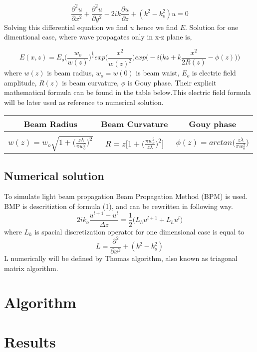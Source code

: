 \documentclass{article}
\begin{document}
	\begin{equation}
	\frac{\partial^2 u}{\partial x^2}+ \frac{\partial^2 u}{\partial y^2} - 2ik\frac{\partial u}{\partial z}+(k^2-k_o^2)u=0
	\end{equation}
	Solving this differential equation we find $u$ hence we find $E$. Solution for one dimentional case, where wave propagates only in x-z plane is,
	
	\[E(x,z)=E_o\bigg(\frac{w_o}{w(z)}\bigg)^{\frac{1}{2}}exp\bigg(\frac{x^2}{w(z)^2}\bigg)exp\bigg(-i\Big(kz+k\frac{x^2}{2R(z)}-\phi(z)\Big)\bigg)\]
	where
	$w(z)$ is beam radius, $w_o = w(0)$ is beam waist, $E_o$ is electric field amplitude, $R(z)$ is beam curvature, $\phi$ is Gouy phase. Their explicit mathematical formula can be found in the table below.This electric field formula will be later used as reference to numerical solution.
	

	\begin{table}[h!]
		\begin{center}
			\label{tab:table1}
			\begin{tabular}{c| c| c} %
				\textbf{Beam Radius} & \textbf{Beam Curvature} & \textbf{Gouy phase}\\
				\hline
				&&\\
				$w(z)= w_o\sqrt{1+\Big(\frac{z\lambda}{\pi w_o^2}\Big)^2}$ & $R=z\bigg[1+\Big(\frac{\pi w_o^2}{z\lambda}\Big)^2\bigg]$ & $\phi(z)=arctan\Big(\frac{z\lambda}{\pi w_o^2}\Big)$\\
			\end{tabular}
		\end{center}
	\end{table}
	
	\subsection{Numerical solution}
	To simulate light beam propagation Beam Propagation Method (BPM) is used. BMP is descritiztion of formula (1), and can be rewritten in following way.
	\[2ik_o\frac{u^{l+1}-u^l}{\Delta z}=\frac{1}{2}\bigg(L_hu^{l+1}+L_hu^l\bigg)\]
	where $L_h$ is spacial discretization operator for one dimensional case is equal to
	\[L= \frac{\partial^2 }{\partial x^2}+(k^2-k_o^2)\]
	L numerically will be defined by Thomas algorithm, also known as triagonal matrix algorithm.
	\section{Algorithm}
	\section{Results}
\end{document}

